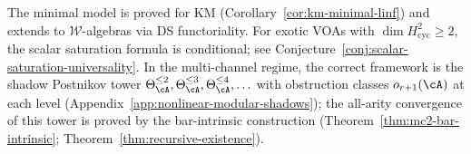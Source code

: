\begin{remark}
\label{rem:explicit-theta-scope}
The minimal model is proved for KM
(Corollary~\ref{cor:km-minimal-linf}) and extends to
$\mathcal{W}$-algebras via DS functoriality.  For exotic VOAs
with $\dim H^2_{\mathrm{cyc}}\geq 2$, the scalar saturation
formula is conditional;
see Conjecture~\ref{conj:scalar-saturation-universality}.
In the multi-channel regime, the correct framework is the
shadow Postnikov tower
$\Theta_\cA^{\leq 2}, \Theta_\cA^{\leq 3}, \Theta_\cA^{\leq 4},\ldots$
with obstruction classes
$o_{r+1}(\cA)$ at each level
(Appendix~\ref{app:nonlinear-modular-shadows});
the all-arity convergence of this tower is proved by the
bar-intrinsic construction
(Theorem~\ref{thm:mc2-bar-intrinsic};
Theorem~\ref{thm:recursive-existence}).
\end{remark}

